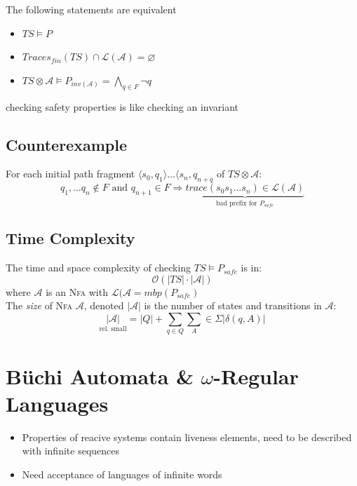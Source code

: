 \documentclass[a4paper, 10pt]{article}
\begin{document}
\begin{shaded}
    The following statements are equivalent
    \begin{itemize}
        \item $TS\models P$
        \item $Traces_{fin}(TS)\cap\mathcal{L}(\mathcal{A})=\varnothing$
        \item $TS\otimes\mathcal{A} \models P_{inv(\mathcal{A})}=\bigwedge_{q\in F} \neg q$
    \end{itemize}
    \follows checking safety properties is like checking an invariant
\end{shaded}

\subsection*{Counterexample}
\begin{shaded}
    For each initial path fragment $\langle s_0,q_1\rangle\dots\langle s_n,q_{n+q}$ of $TS\otimes\mathcal{A}:$
    \[
    q_1,\dots q_n\not\in F \textrm{ and } q_{n+1}\in F \Rightarrow \underset{\textrm{bad prefix for } P_{safe}}{\underbrace{trace(s_0s_1\dots s_n)\in\mathcal{L(\mathcal{A})}}}
    \]
\end{shaded}


\subsection*{Time Complexity}
\begin{shaded}
    The time and space complexity of checking $TS\models P_{safe}$ is in:
    \[ \mathcal{O} (|TS|\cdot|\mathcal{A}|) \]
    where $\mathcal{A}$ is an \textsc{Nfa} with $\mathcal{L}(\mathcal{A}=mbp(P_{safe})$
\\ The \emph{size} of \textsc{Nfa} $\mathcal{A}$, denoted $|\mathcal{A}|$ is the number of states and transitions in $\mathcal{A}:$
\[ \underset{\textrm{rel. small}}{|\mathcal{A}|} = |Q| + \sum_{q\in Q} \sum_{A}\in\Sigma |\delta(q,A)| \]
\end{shaded}

\section*{Büchi Automata \& $\omega$-Regular Languages}
\begin{itemize}
    \item Properties of reacive systems contain liveness elements, need to be described with infinite sequences
    \item Need acceptance of languages of infinite words
\end{itemize}
\end{document}
